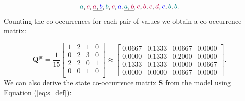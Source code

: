 \documentclass[shortabstract]{iithesis}
\begin{document}
$$\textcolor{teal}{a}, \textcolor{purple}{c}, \underline{\textcolor{purple}{a}, \textcolor{blue}{b}}, \textcolor{teal}{b}, \textcolor{purple}{c}, \textcolor{blue}{a}, \underline{\textcolor{teal}{a}, \textcolor{purple}{b}}, \textcolor{purple}{c}, \textcolor{purple}{b}, \textcolor{purple}{c}, \textcolor{purple}{d}, \textcolor{blue}{c}, \textcolor{teal}{b}, \textcolor{teal}{b}\text{.}$$
\linebreak
Counting the co-occurrences for each pair of values we obtain a co-occurrence matrix:

\begin{equation*}
    \textbf{Q}^{gt} = \frac 1 {15} \left [ \begin{array}{cccc}
        1 & 2 & 1 & 0 \\
        0 & 2 & 3 & 0 \\
        2 & 2 & 0 & 1 \\
        0 & 0 & 1 & 0 \\ 
    \end{array} \right ]  \approx 
    \left [ \begin{array}{cccc}
      0.0667 &  0.1333 &  0.0667 &  0.0000\\
      0.0000 &  0.1333 &  0.2000 &  0.0000\\
      0.1333 &  0.1333 &  0.0000 &  0.0667\\
      0.0000 &  0.0000 &  0.0667 &  0.0000
    \end{array} \right ]\text{.}
\end{equation*}
\linebreak
We can also derive the state co-occurrence matrix $\textbf{S}$ from the model using Equation (\ref{eq:s_def}):
\end{document}
